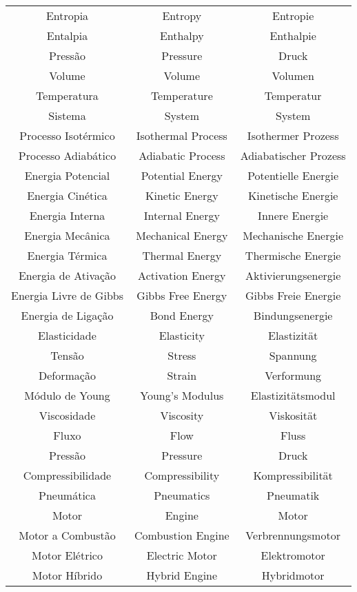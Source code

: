 \begin{table}[ht]
\begin{tabular}{|c|c|c|}
    Entropia & Entropy & Entropie \\
    Entalpia & Enthalpy & Enthalpie \\
    Pressão & Pressure & Druck \\
    Volume & Volume & Volumen \\
    Temperatura & Temperature & Temperatur \\
    Sistema & System & System \\
    Processo Isotérmico & Isothermal Process & Isothermer Prozess \\
    Processo Adiabático & Adiabatic Process & Adiabatischer Prozess \\
    Energia Potencial & Potential Energy & Potentielle Energie \\
    Energia Cinética & Kinetic Energy & Kinetische Energie \\
    Energia Interna & Internal Energy & Innere Energie \\
    Energia Mecânica & Mechanical Energy & Mechanische Energie \\
    Energia Térmica & Thermal Energy & Thermische Energie \\
    Energia de Ativação & Activation Energy & Aktivierungsenergie \\
    Energia Livre de Gibbs & Gibbs Free Energy & Gibbs Freie Energie \\
    Energia de Ligação & Bond Energy & Bindungsenergie \\
    Elasticidade & Elasticity & Elastizität \\
    Tensão & Stress & Spannung \\
    Deformação & Strain & Verformung \\
    Módulo de Young & Young's Modulus & Elastizitätsmodul \\
    Viscosidade & Viscosity & Viskosität \\
    Fluxo & Flow & Fluss \\
    Pressão & Pressure & Druck \\
    Compressibilidade & Compressibility & Kompressibilität \\
    Pneumática & Pneumatics & Pneumatik \\
    Motor & Engine & Motor \\
    Motor a Combustão & Combustion Engine & Verbrennungsmotor \\
    Motor Elétrico & Electric Motor & Elektromotor \\
    Motor Híbrido & Hybrid Engine & Hybridmotor \\

\end{tabular}
\end{table}
